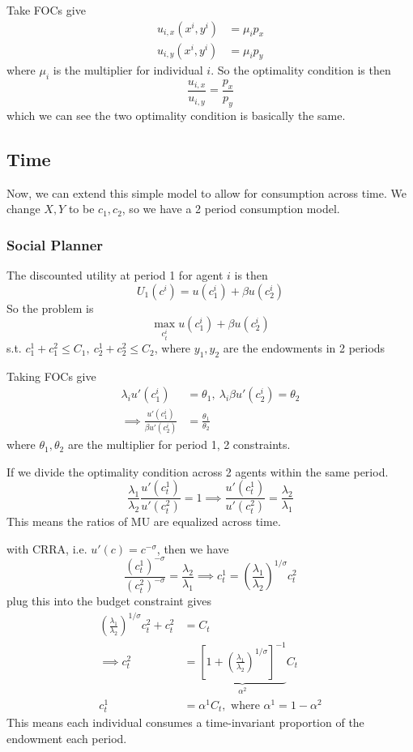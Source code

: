 \documentclass[twocolumn, fleqn]{article}
\numberwithin{equation}{section}
\begin{document}
	Take FOCs give 
	\begin{align*}
		u_{i,x}(x^i, y^i) &= \mu_i p_x\\
		u_{i,y}(x^i, y^i) &= \mu_i p_y
	\end{align*}
	where $\mu_i$ is the multiplier for individual $i$.
	So the optimality condition is then
	\[ \frac{u_{i,x}}{u_{i,y}}= \frac{p_x}{p_y}\]
	which we can see the two optimality condition is basically the same.
	
	\subsection{Time}
	Now, we can extend this simple model to allow for consumption across time. We change $X, Y$ to be $c_1, c_2$, so we have a 2 period consumption model.
	\subsubsection{Social Planner}
	The discounted utility at period 1 for agent $i$ is then
	\[U_1(c^i) = u(c_1^i) + \beta u(c_2^i)\]
	So the problem is 
	\[ \max_{c_t^i} u(c_1^i) + \beta u(c_2^i)\]
	s.t. \(c^1_1 + c_1^2 \leq C_1, \ c_2^1 + c_2^2 \leq C_2\),
	where $y_1, y_2$ are the endowments in 2 periods
	
	Taking FOCs give
	\begin{align*}
		\lambda_i u'(c_1^i) &= \theta_1, \ \lambda_i \beta u'(c_2^i) = \theta_2\\
		\implies \frac{u'(c_1^i)}{\beta u'(c_2^i)} &= \frac{\theta_1}{\theta_2}
	\end{align*}
	where $\theta_1, \theta_2$ are the multiplier for period 1, 2 constraints.
	
	If we divide the optimality condition across 2 agents within the same period. 
	\[\frac{\lambda_1}{\lambda_2} \frac{u'(c_t^1)}{u'(c_t^2)}=1 \implies \frac{u'(c_t^1)}{u'(c_t^2)}  = \frac{\lambda_2}{\lambda_1}\]
	This means the ratios of MU are equalized across time.
	
	with CRRA, i.e. $u'(c) = c^{-\sigma}$, then we have 
	\[\frac{(c_t^1)^{-\sigma}}{(c_t^2)^{-\sigma}} = \frac{\lambda_2}{\lambda_1} \implies c_t^1=\left(\frac{\lambda_1}{\lambda_2}\right)^{1/\sigma} c_t^2\]
	plug this into the budget constraint gives
	\begin{align*}
		\left(\frac{\lambda_1}{\lambda_2}\right)^{1/\sigma} c_t^2+c_t^2 &= C_t\\
		\implies c_t^2 &= \underbrace{\left[1+ \left(\frac{\lambda_1}{\lambda_2}\right)^{1/\sigma}\right]^{-1}}_{\alpha^2}C_t\\
		c_t^1 &= \alpha^1 C_t, \text{ where } \alpha^1 = 1-\alpha^2
	\end{align*}
	This means each individual consumes a time-invariant proportion of the endowment each period.
	
\end{document}
